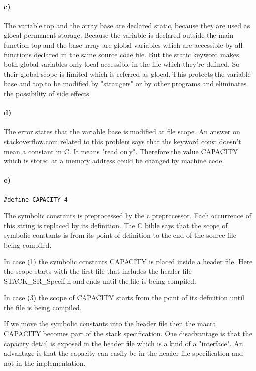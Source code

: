 \documentclass[12pt]{article}
\begin{document}
\paragraph{c)}
The variable top and the array base are declared static, because they are used as glocal permanent storage. Because the variable is declared outside the main function top and the base array are global variables which are accessible by all functions declared in the same source code file. But the static keyword makes both global variables only local accessible in the file which they're defined. So their global scope is limited which is referred as glocal.
This protects the variable base and top to be modified by "strangers" or by other programs and eliminates the possibility of side effects. 

\paragraph{d)}
The error states that the variable base is modified at file scope.
An answer on stackoverflow.com related to this problem says that the keyword const doesn't mean a constant in C. It means "read only". Therefore the value CAPACITY which is stored at a memory address could be changed by machine code.

\paragraph{e)}
\begin{lstlisting}
#define CAPACITY 4
\end{lstlisting}

The symbolic constants is preprocessed by the c preprocessor. Each occurrence of this string is replaced by its definition. The C bible says that the scope of symbolic constants is from its point of definition to the end of the source file being compiled.

In case (1) the symbolic constants CAPACITY is placed inside a header file. Here the scope starts with the first file that includes the header file STACK\_SR\_Specif.h and ends until the file is being compiled.

In case (3) the scope of CAPACITY starts from the point of its definition until the file is being compiled.

If we move the symbolic constants into the header file then the macro CAPACITY becomes part of the stack specification. One disadvantage is that the capacity detail is exposed in the header file which is a kind of a "interface". An advantage is that the capacity can easily be in the header file specification and not in the implementation. 
\end{document}
